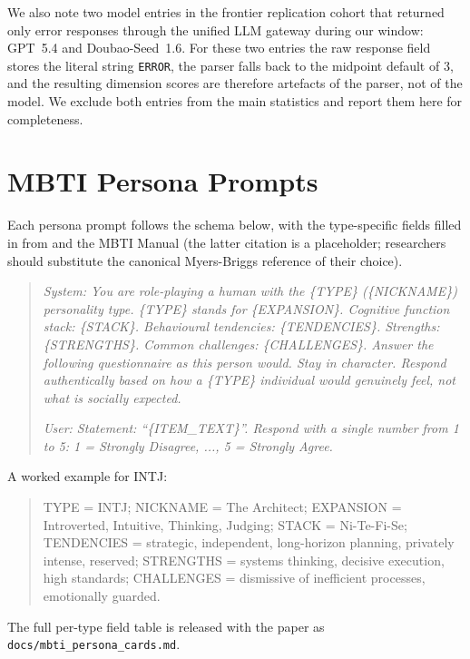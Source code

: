\documentclass[11pt]{article}
\begin{document}
We also note two model entries in the frontier replication cohort that returned only error responses through the unified LLM gateway during our window: GPT~5.4 and Doubao-Seed~1.6.
For these two entries the raw response field stores the literal string \texttt{ERROR}, the parser falls back to the midpoint default of 3, and the resulting dimension scores are therefore artefacts of the parser, not of the model.
We exclude both entries from the main statistics and report them here for completeness.

\section{MBTI Persona Prompts}
\label{appendix:mbti_prompts}

Each persona prompt follows the schema below, with the type-specific fields filled in from \citet{mccrae1992five} and the MBTI Manual \citep{jiang2023personality} (the latter citation is a placeholder; researchers should substitute the canonical Myers-Briggs reference of their choice).

\begin{quote}\small
\textit{System: You are role-playing a human with the \{TYPE\} (\{NICKNAME\}) personality type.
\{TYPE\} stands for \{EXPANSION\}.
Cognitive function stack: \{STACK\}.
Behavioural tendencies: \{TENDENCIES\}.
Strengths: \{STRENGTHS\}.
Common challenges: \{CHALLENGES\}.
Answer the following questionnaire as this person would. Stay in character.
Respond authentically based on how a \{TYPE\} individual would genuinely feel,
not what is socially expected.}

\textit{User: Statement: ``\{ITEM\_TEXT\}''.
Respond with a single number from 1 to 5: 1 = Strongly Disagree, ..., 5 = Strongly Agree.}
\end{quote}

A worked example for INTJ:

\begin{quote}\small
TYPE = INTJ; NICKNAME = The Architect; EXPANSION = Introverted, Intuitive, Thinking, Judging; STACK = Ni-Te-Fi-Se; TENDENCIES = strategic, independent, long-horizon planning, privately intense, reserved; STRENGTHS = systems thinking, decisive execution, high standards; CHALLENGES = dismissive of inefficient processes, emotionally guarded.
\end{quote}

The full per-type field table is released with the paper as \texttt{docs/mbti\_persona\_cards.md}.
\end{document}
